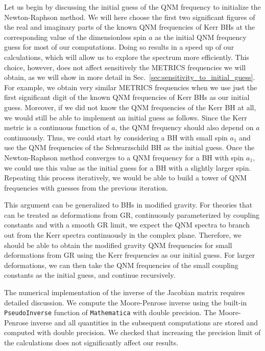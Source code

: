 \documentclass[aps,prx,amsmath,floats,floatfix,twocolumn,
  superscriptaddress,nofootinbib,showpacs]{revtex4-1}
\begin{document}
Let us begin by discussing the initial guess of the QNM frequency to initialize the Newton-Raphson method. 
We will here choose the first two significant figures of the real and imaginary parts of the known QNM frequencies of Kerr BHs at the corresponding value of the dimensionless spin $a$ as the initial QNM frequency guess for most of our computations. 
Doing so results in a speed up of our calculations, which will allow us to explore the spectrum more efficiently. 
This choice, however, does not affect sensitively the METRICS frequencies we will obtain, as we will show in more detail in Sec.~\ref{sec:sensitivity_to_initial_guess}. 
For example, we obtain very similar METRICS frequencies when we use just the first significant digit of the known QNM frequencies of Kerr BHs as our initial guess.
Moreover, if we did not know the QNM frequencies of the Kerr BH at all, we would still be able to implement an initial guess as follows. 
Since the Kerr metric is a continuous function of $a$, the QNM frequency should also depend on $a$ continuously. 
Thus, we could start by considering a BH with small spin $a_1$ and use the QNM frequencies of the Schwarzschild BH as the initial guess. 
Once the Newton-Raphson method converges to a QNM frequency for a BH with spin $a_1$, we could use this value as the initial guess for a BH with a slightly larger spin. 
Repeating this process iteratively, we would be able to build a tower of QNM frequencies with guesses from the previous iteration. 

This argument can be generalized to BHs in modified gravity. For theories that can be treated as deformations from GR, continuously parameterized by coupling constants and with a smooth GR limit, we expect the QNM spectra to branch out from the Kerr spectra continuously in the complex plane. Therefore, we should be able to obtain the modified gravity QNM frequencies for small deformations from GR using the Kerr frequencies as our initial guess. For larger deformations, we can then take the QNM frequencies of the small coupling constants as the initial guess, and continue recursively.

The numerical implementation of the inverse of the Jacobian matrix requires detailed discussion. 
We compute the Moore-Penrose inverse using the built-in \texttt{PseudoInverse} function of \texttt{Mathematica} with double precision. 
The Moore-Penrose inverse and all quantities in the subsequent computations are stored and computed with double precision. 
We checked that increasing the precision limit of the calculations does not significantly affect our results.  
\end{document}
